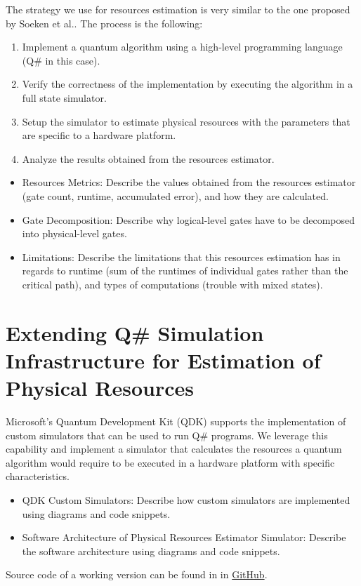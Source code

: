 The strategy we use for resources estimation is very similar to the one proposed by Soeken et al.\cite{ResourceEstimationFramework_Soeken_2021}. The process is the following:
\begin{enumerate}
    \item Implement a quantum algorithm using a high-level programming language (Q\# in this case).
    \item Verify the correctness of the implementation by executing the algorithm in a full state simulator.
    \item Setup the simulator to estimate physical resources with the parameters that are specific to a hardware platform.
    \item Analyze the results obtained from the resources estimator.
\end{enumerate}

\begin{itemize}
    \item Resources Metrics: Describe the values obtained from the resources estimator (gate count, runtime, accumulated error), and how they are calculated.
    \item Gate Decomposition: Describe why logical-level gates have to be decomposed into physical-level gates.
    \item Limitations: Describe the limitations that this resources estimation has in regards to runtime (sum of the runtimes of individual gates rather than the critical path), and types of computations (trouble with mixed states).
\end{itemize}

\section{Extending Q\# Simulation Infrastructure for Estimation of Physical Resources}

Microsoft's Quantum Development Kit (QDK) supports the implementation of custom simulators that can be used to run Q\# programs. We leverage this capability and implement a simulator that calculates the resources a quantum algorithm would require to be executed in a hardware platform with specific characteristics.

\begin{itemize}
    \item QDK Custom Simulators: Describe how custom simulators are implemented using diagrams and code snippets.
    \item Software Architecture of Physical Resources Estimator Simulator: Describe the software architecture using diagrams and code snippets.
\end{itemize}

Source code of a working version can be found in in \href{https://github.com/cesarzc/uw-master-in-physics-project}{GitHub}.
